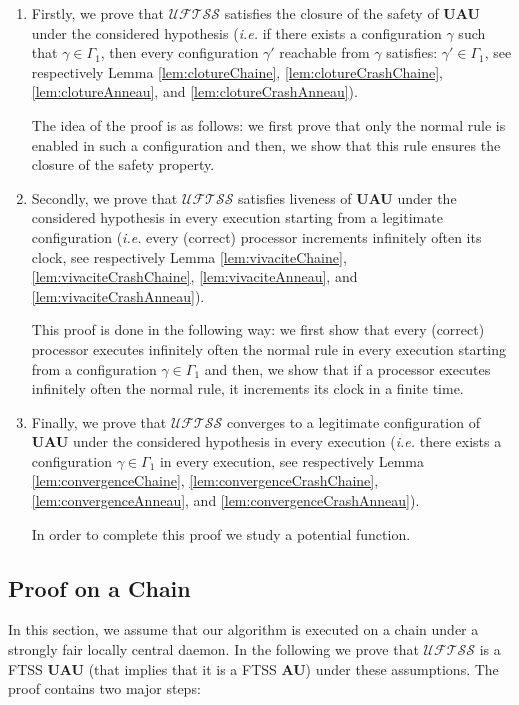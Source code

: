 \documentclass[11pt,english,letterpaper]{article}
\begin{document}
\begin{enumerate}
\item Firstly, we prove that $\mathcal{UFTSS}$ satisfies the closure of the safety of \textbf{UAU} under the considered hypothesis (\emph{i.e.} if there exists a configuration $\gamma$ such that $\gamma\in\Gamma_{1}$, then every configuration $\gamma'$ reachable from $\gamma$ satisfies: $\gamma'\in\Gamma_{1}$, see respectively Lemma \ref{lem:clotureChaine}, \ref{lem:clotureCrashChaine}, \ref{lem:clotureAnneau}, and \ref{lem:clotureCrashAnneau}).

The idea of the proof is as follows: we first prove that only the normal rule is enabled in such a configuration and then, we show that this rule ensures the closure of the safety property.
\item Secondly, we prove that $\mathcal{UFTSS}$ satisfies liveness of \textbf{UAU} under the considered hypothesis in every execution starting from a legitimate configuration (\emph{i.e.} every (correct) processor increments infinitely often its clock, see respectively Lemma \ref{lem:vivaciteChaine}, \ref{lem:vivaciteCrashChaine}, \ref{lem:vivaciteAnneau}, and \ref{lem:vivaciteCrashAnneau}).

This proof is done in the following way: we first show that every (correct) processor executes infinitely often the normal rule in every execution starting from a configuration $\gamma\in\Gamma_{1}$ and then, we show that if a processor executes infinitely often the normal rule, it increments its clock in a finite time.
\item Finally, we prove that $\mathcal{UFTSS}$ converges to a legitimate configuration of \textbf{UAU} under the considered hypothesis in every execution (\emph{i.e.} there exists a configuration $\gamma\in\Gamma_{1}$ in every execution, see respectively Lemma \ref{lem:convergenceChaine}, \ref{lem:convergenceCrashChaine}, \ref{lem:convergenceAnneau}, and \ref{lem:convergenceCrashAnneau}).

In order to complete this proof we study a potential function.
\end{enumerate}

\subsection{Proof on a Chain}

In this section, we assume that our algorithm is executed on a chain under a strongly fair locally central daemon. In the following we prove that $\mathcal{UFTSS}$ is a FTSS \textbf{UAU} (that implies that it is a FTSS \textbf{AU}) under these assumptions. The proof contains two major steps:
\end{document}
